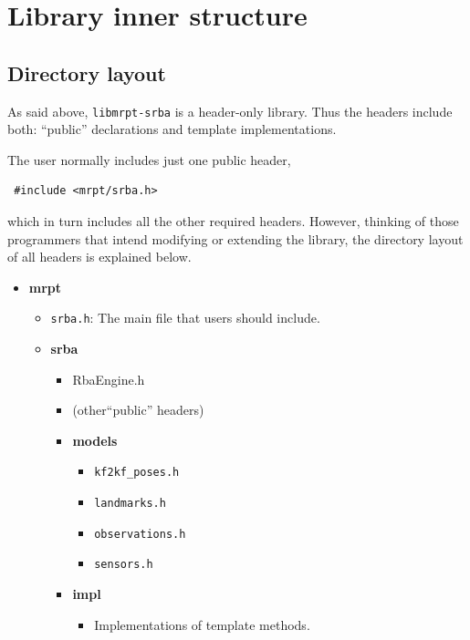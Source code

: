 \documentclass[a4paper,11pt]{article}
\begin{document}
\clearpage

\newpage
\section{Library inner structure}

\subsection{Directory layout}

As said above, \texttt{libmrpt-srba} is a header-only library. 
Thus the headers include both: ``public'' declarations and template implementations. 

The user normally includes just one public header,

\begin{lstlisting}
 #include <mrpt/srba.h>
\end{lstlisting}

\noindent which in turn includes all the other required headers. 
However, thinking of those programmers that intend modifying or extending the library, 
the directory layout of all headers is explained below. 

\begin{itemize}[label=$\rhd$]
  \item{\textbf{mrpt}
    \begin{itemize}[label=$\rhd$]
    \item{\texttt{srba.h}: The main file that users should include.}
    \item{\textbf{srba}
      \begin{itemize}[label=$\rhd$]
      \item{RbaEngine.h}
      \item{(other``public'' headers)}
      \item{\textbf{models}
	\begin{itemize}[label=$\rhd$]
	  \item \texttt{kf2kf\_poses.h}
	  \item \texttt{landmarks.h}
	  \item \texttt{observations.h}
	  \item \texttt{sensors.h}
	\end{itemize}
      }
      \item{\textbf{impl}
	\begin{itemize}[label=$\rhd$]
	\item Implementations of template methods.
	\end{itemize}
	}
      \end{itemize}
    }
    \end{itemize}
  }
\end{itemize}
\end{document}
